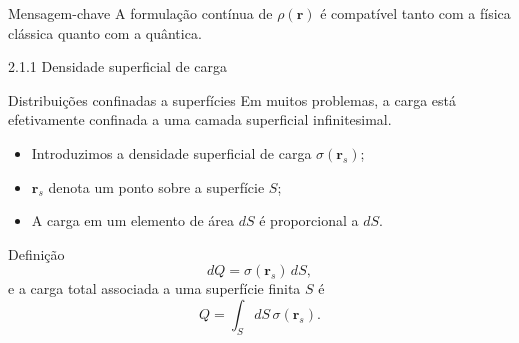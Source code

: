 \documentclass[aspectratio=169]{beamer}
\newcommand{\blue}[1]{\textcolor{myblue}{#1}}
\begin{document}
\begin{frame}
\begin{alertblock}{Mensagem-chave}
A formulação contínua de $\rho(\bm r)$ é compatível tanto com a física clássica
quanto com a quântica.
\end{alertblock}
\end{frame}

\begin{frame}{2.1.1 Densidade superficial de carga}
\begin{block}{Distribuições confinadas a superfícies}
Em muitos problemas, a carga está efetivamente confinada
a uma \blue{camada superficial infinitesimal}.
\end{block}

\begin{itemize}
  \item Introduzimos a densidade superficial de carga $\sigma(\bm r_s)$;
  \item $\bm r_s$ denota um ponto sobre a superfície $S$;
  \item A carga em um elemento de área $dS$ é proporcional a $dS$.
\end{itemize}

\begin{block}{Definição}
\begin{equation}
dQ = \sigma(\bm r_s)\, dS,
\label{eq:dQ_surface}
\end{equation}
e a carga total associada a uma superfície finita $S$ é
\begin{equation}
Q = \int_S dS\, \sigma(\bm r_s).
\tag{2.5}
\label{eq:Q_surface}
\end{equation}
\end{block}
\end{frame}
\end{document}
